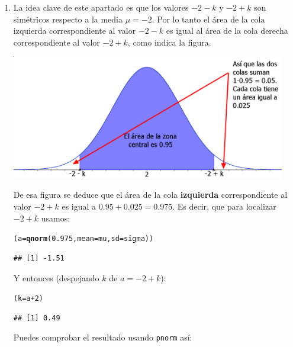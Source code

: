 \documentclass[10pt,a4paper]{article}\usepackage[]{graphicx}\usepackage[]{color}
\makeatletter
\newcommand{\hlnum}[1]{\textcolor[rgb]{0.686,0.059,0.569}{#1}}%
\newcommand{\hlopt}[1]{\textcolor[rgb]{0,0,0}{#1}}%
\newcommand{\hlstd}[1]{\textcolor[rgb]{0.345,0.345,0.345}{#1}}%
\newcommand{\hlkwb}[1]{\textcolor[rgb]{0.69,0.353,0.396}{#1}}%
\newcommand{\hlkwc}[1]{\textcolor[rgb]{0.333,0.667,0.333}{#1}}%
\newcommand{\hlkwd}[1]{\textcolor[rgb]{0.737,0.353,0.396}{\textbf{#1}}}%
\newenvironment{kframe}{%
 \def\at@end@of@kframe{}%
 \ifinner\ifhmode%
  \def\at@end@of@kframe{\end{minipage}}%
  \begin{minipage}{\columnwidth}%
 \fi\fi%
 \def\FrameCommand##1{\hskip\@totalleftmargin \hskip-\fboxsep
 \colorbox{shadecolor}{##1}\hskip-\fboxsep
     \hskip-\linewidth \hskip-\@totalleftmargin \hskip\columnwidth}%
 \MakeFramed {\advance\hsize-\width
   \@totalleftmargin\z@ \linewidth\hsize
   \@setminipage}}%
 {\par\unskip\endMakeFramed%
 \at@end@of@kframe}
\newenvironment{knitrout}{}{} %
\makeatother
\begin{document}
\begin{enumerate}
  \item La idea clave de este apartado es que los valores $-2 - k$ y $-2 + k$ son simétricos respecto a la media $\mu = -2$. Por lo tanto el área de la cola izquierda correspondiente al valor $-2-k$ es igual al área de la cola derecha correspondiente al valor $-2 + k$, como indica la figura.
        \begin{center}
        \includegraphics[width=12cm]{../fig/Tut05-68.png}
        \end{center}
      De esa figura se deduce que el área de la cola {\bf izquierda} correspondiente al valor $-2 + k$ es igual a $0.95 + 0.025 = 0.975$. Es decir, que para localizar $-2 + k$ usamos:
\begin{knitrout}
\color{fgcolor}\begin{kframe}
\begin{alltt}
    \hlstd{(a} \hlkwb{=} \hlkwd{qnorm}\hlstd{(}\hlnum{0.975}\hlstd{,} \hlkwc{mean}\hlstd{=mu,} \hlkwc{sd}\hlstd{=sigma))}
\end{alltt}
\begin{verbatim}
## [1] -1.51
\end{verbatim}
\end{kframe}
\end{knitrout}
    Y entonces (despejando $k$ de $a = -2 + k$):
\begin{knitrout}
\color{fgcolor}\begin{kframe}
\begin{alltt}
    \hlstd{(k} \hlkwb{=}  \hlstd{a} \hlopt{+} \hlnum{2}\hlstd{)}
\end{alltt}
\begin{verbatim}
## [1] 0.49
\end{verbatim}
\end{kframe}
\end{knitrout}
    Puedes comprobar el resultado usando {\tt pnorm} así:
\begin{knitrout}

\end{knitrout}
\end{enumerate}
\end{document}
